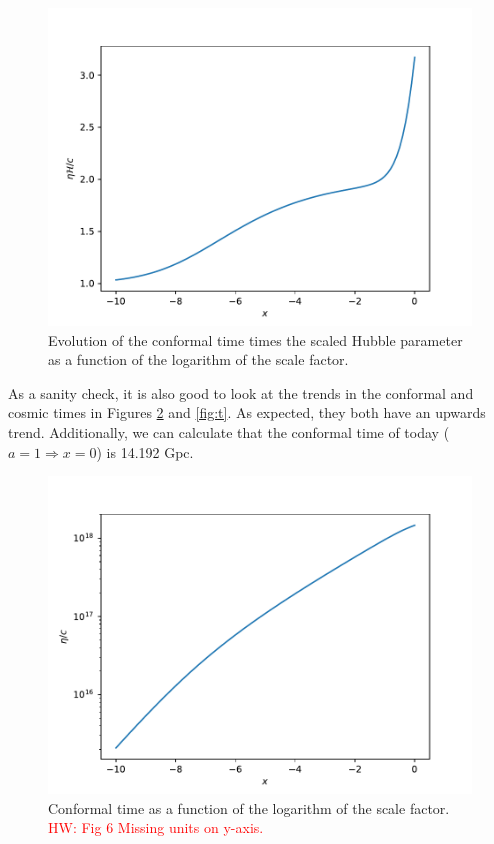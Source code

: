 \documentclass{aa}
\newcommand{\hw}[1]{\textcolor{red}{HW: #1}}
\begin{document}
\begin{figure}[ht]
\centering
\includegraphics[width=\hsize]{figures/etaHp_over_c.pdf}
  \caption{Evolution of the conformal time times the scaled Hubble parameter as a function of the logarithm of the scale factor.}
     \label{fig:eta}
\end{figure}

As a sanity check, it is also good to look at the trends in the conformal and cosmic times in Figures \ref{fig:eta} and \ref{fig:t}. As expected, they both have an upwards trend. Additionally, we can calculate that the conformal time of today ($a = 1 \Rightarrow x = 0$) is 14.192 Gpc.

\begin{figure}[ht]
\centering
\includegraphics[width=\hsize]{figures/eta_over_c.pdf}
  \caption{Conformal time as a function of the logarithm of the scale factor. \hw{Fig 6 Missing units on y-axis.}}
     \label{fig:eta}
\end{figure}
\end{document}

